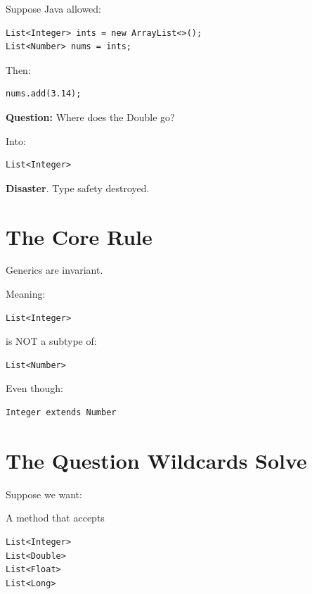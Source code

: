 \documentclass[11pt,a4paper]{book}
\newcommand{\question}[1]{
\vspace{0.5em}
\textbf{Question:} #1?
\vspace{0.2em}
}
\begin{document}
Suppose Java allowed:

\begin{verbatim} 
List<Integer> ints = new ArrayList<>();
List<Number> nums = ints;
\end{verbatim}

Then:

\begin{verbatim} 
nums.add(3.14);
\end{verbatim}

\question{Where does the Double go}

Into:

\begin{verbatim} 
List<Integer>
\end{verbatim}

\textbf{Disaster}.
\textcolor{RosettaDeepGreen}{Type safety} destroyed.

\section{The Core Rule}

\begin{rosettarule}

Generics are invariant.

\end{rosettarule}

Meaning:

\begin{verbatim} 
List<Integer>
\end{verbatim}

is NOT a subtype of:

\begin{verbatim} 
List<Number>
\end{verbatim}

Even though:

\begin{verbatim} 
Integer extends Number
\end{verbatim}

\section{The Question Wildcards Solve}

Suppose we want:

A method that accepts
\begin{verbatim}
List<Integer>
List<Double>
List<Float>
List<Long>
\end{verbatim}
\end{document}
